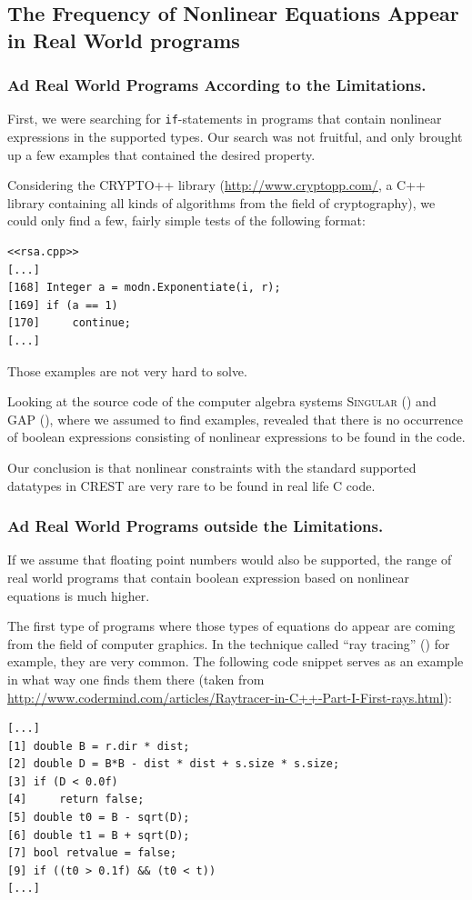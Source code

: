 \documentclass[oribibl]{llncs}
\begin{document}
\subsection{The Frequency of Nonlinear Equations Appear in Real World
  programs}

\subsubsection{Ad Real World Programs According to the Limitations.}
First, we were searching for \texttt{if}-statements in programs that
contain nonlinear expressions in the supported types. Our search was
not fruitful, and only brought up a few examples that contained the
desired property.

Considering the \textsc{CRYPTO++} library
(\url{http://www.cryptopp.com/}, a \textsc{C++} library containing all kinds of algorithms from the field of cryptography), we could only find a few, fairly
simple tests of the following format:

\begin{verbatim}
<<rsa.cpp>>
[...]
[168] Integer a = modn.Exponentiate(i, r);
[169] if (a == 1)
[170]     continue;
[...]
\end{verbatim}

Those examples are not very hard to solve.

Looking at the source code of the computer algebra systems \textsc{Singular} (\cite{Singular:2012})
and \textsc{GAP} (\cite{GAP4}), where we assumed to find examples,
revealed that there is no occurrence of boolean expressions consisting
of nonlinear expressions to be
found in the code.

Our conclusion is that nonlinear constraints with the standard
supported datatypes in \textsc{CREST} are very rare to be found in
real life \textsc{C} code.

\subsubsection{Ad Real World Programs outside the Limitations.}

If we assume that floating point numbers would also be supported, the
range of real world programs that contain boolean expression based on
nonlinear equations is much higher.

The first type of programs where those types of equations do appear
are coming from the field of computer graphics. In the technique called ``ray
tracing'' (\cite{glassner1989introduction}) for example, they are very common. The following code snippet serves as an example in what way one finds them there (taken from \url{http://www.codermind.com/articles/Raytracer-in-C++-Part-I-First-rays.html}):
\begin{verbatim}
[...]
[1] double B = r.dir * dist;
[2] double D = B*B - dist * dist + s.size * s.size; 
[3] if (D < 0.0f) 
[4]     return false; 
[5] double t0 = B - sqrt(D); 
[6] double t1 = B + sqrt(D);
[7] bool retvalue = false;  
[9] if ((t0 > 0.1f) && (t0 < t)) 
[...]
\end{verbatim}
\end{document}
